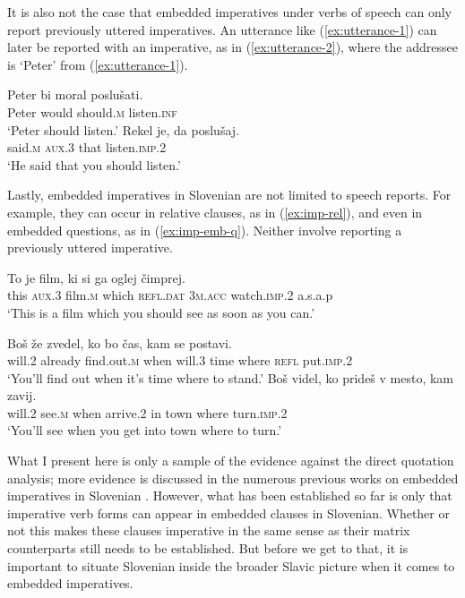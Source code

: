 \documentclass[output=paper,colorlinks,citecolor=brown]{langscibook}
\begin{document}
\noindent It is also not the case that embedded imperatives under verbs of speech can only report previously uttered imperatives. An utterance like (\ref{ex:utterance-1}) can later be reported with an imperative, as in (\ref{ex:utterance-2}), where the addressee is `Peter' from (\ref{ex:utterance-1}). 

\ea \label{ex:utterance} 
\ea
\gll Peter bi moral poslu\v{s}ati.\\
     Peter would should.\textsc{m} listen.\textsc{inf}\\
\glt `Peter should listen.'  \label{ex:utterance-1}   
\ex 
\gll Rekel je, da poslu\v{s}aj.\\
     said.\textsc{m} \textsc{aux.3} that listen.\textsc{imp.2}\\     
\glt `He said that you should listen.'\hfill \citep[643]{stegoveckaufmann}\label{ex:utterance-2}
\z\z

\noindent Lastly, embedded imperatives in Slovenian are not limited to speech reports. For example, they can occur in relative clauses, as in (\ref{ex:imp-rel}), and even in embedded questions, as in (\ref{ex:imp-emb-q}). Neither involve reporting a previously uttered imperative.

\ea {}
\gll To je film, ki si ga oglej \v{c}imprej.\\
     this \textsc{aux.3} film.\textsc{m} which \textsc{refl.dat} \textsc{3m.acc} watch.\textsc{imp.2} a.s.a.p\\
\glt `This is a film which you should see as soon as you can.'\\\hfill \citep[251]{sheppardgolden02}  \label{ex:imp-rel}
\z

\ea {}\label{ex:imp-emb-q}
	\ea 
	\gll Bo\v{s} \v{z}e zvedel, ko bo \v{c}as, kam se postavi.\\
	     will.\textsc{2} already find.out.\textsc{m} when will.\textsc{3} time where \textsc{refl} put.\textsc{imp.2}\\
	 \glt `You'll find out when it's time where to stand.' 
	\ex 
\gll Bo\v{s} videl, ko pride\v{s} v mesto, kam zavij.\\
will.\textsc{2} see.\textsc{m} when arrive.\textsc{2} in town where turn.\textsc{imp.2}\\
\glt `You'll see when you get into town where to turn.'	 
\z\z

\noindent What I present here is only a sample of the evidence against the direct quotation analysis; more evidence is discussed in the numerous previous works on embedded imperatives in Slovenian \citep[see][]{sheppardgolden02,bdvorak05,rus05,dvorakzimm08,stegoveckaufmann}. However, what has been established so far is only that imperative verb forms can appear in embedded clauses in Slovenian. Whether or not this makes these clauses imperative in the same sense as their matrix counterparts still needs to be established. But before we get to that, it is important to situate Slovenian inside the broader Slavic picture when it comes to embedded imperatives. %
\end{document}
